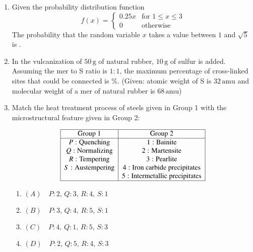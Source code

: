 \documentclass[journal]{IEEEtran}
\numberwithin{equation}{enumi}
\numberwithin{figure}{enumi}
\begin{document}
\begin{enumerate}
    \bigskip

    \item Given the probability distribution function
    \[
    f(x) = 
    \begin{cases} 
      0.25x & \text{for } 1 \leq x \leq 3 \\
      0 & \text{otherwise}
    \end{cases}
    \]
    The probability that the random variable $x$ takes a value between $1$ and $\sqrt{5}$ is \underline{\hspace{1cm}}.
    
    \bigskip

    \item In the vulcanization of $50 \, \text{g}$ of natural rubber, $10 \, \text{g}$ of sulfur is added. Assuming the mer to S ratio is $1:1$, the maximum percentage of cross-linked sites that could be connected is \underline{\hspace{1cm}} \%. (Given: atomic weight of S is $32 \, \text{amu}$ and molecular weight of a mer of natural rubber is $68 \, \text{amu}$)
    
    \bigskip

    \item Match the heat treatment process of steels given in Group 1 with the microstructural feature given in Group 2:
    
    \[
    \begin{array}{|c|c|}
    \hline
    \text{Group 1} & \text{Group 2} \\
    \hline
    P: \text{Quenching} & 1: \text{Bainite} \\
    Q: \text{Normalizing} & 2: \text{Martensite} \\
    R: \text{Tempering} & 3: \text{Pearlite} \\
    S: \text{Austempering} & 4: \text{Iron carbide precipitates} \\
    & 5: \text{Intermetallic precipitates} \\
    \hline
    \end{array}
    \]
    
    \begin{enumerate}
        \item $(A) \quad P: 2, \, Q: 3, \, R: 4, \, S: 1$
        \item $(B) \quad P: 3, \, Q: 4, \, R: 5, \, S: 1$
        \item $(C) \quad P: 4, \, Q: 1, \, R: 5, \, S: 3$
        \item $(D) \quad P: 2, \, Q: 5, \, R: 4, \, S: 3$
    \end{enumerate}
    

\end{enumerate}
\end{document}
